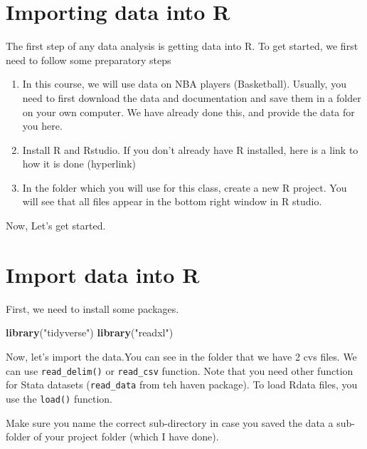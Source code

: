 \documentclass[
]{book}
\newenvironment{Shaded}{\begin{snugshade}}{\end{snugshade}}
\newcommand{\FunctionTok}[1]{\textcolor[rgb]{0.13,0.29,0.53}{\textbf{#1}}}
\newcommand{\NormalTok}[1]{#1}
\newcommand{\StringTok}[1]{\textcolor[rgb]{0.31,0.60,0.02}{#1}}
\begin{document}
\hypertarget{importing-data-into-r}{%
\section{Importing data into R}\label{importing-data-into-r}}

The first step of any data analysis is getting data into R. To get started, we first need to follow some preparatory steps

\begin{enumerate}
\def\labelenumi{\arabic{enumi}.}
\item
  In this course, we will use data on NBA players (Basketball). Usually, you need to first download the data and documentation and save them in a folder on your own computer. We have already done this, and provide the data for you here.
\item
  Install R and Rstudio. If you don't already have R installed, here is a link to how it is done (hyperlink)
\item
  In the folder which you will use for this class, create a new R project. You will see that all files appear in the bottom right window in R studio.
\end{enumerate}

Now, Let's get started.

\hypertarget{import-data-into-r}{%
\section{Import data into R}\label{import-data-into-r}}

First, we need to install some packages.

\begin{Shaded}
\begin{Highlighting}[]
\FunctionTok{library}\NormalTok{(}\StringTok{"tidyverse"}\NormalTok{)}
\FunctionTok{library}\NormalTok{(}\StringTok{"readxl"}\NormalTok{)}
\end{Highlighting}
\end{Shaded}

Now, let's import the data.You can see in the folder that we have 2 cvs files.
We can use \texttt{read\_delim()} or \texttt{read\_csv} function. Note that you need other function for Stata datasets (\texttt{read\_data} from teh haven package). To load Rdata files, you use the \texttt{load()} function.

Make sure you name the correct sub-directory in case you saved the data a sub-folder of your project folder (which I have done).
\end{document}
